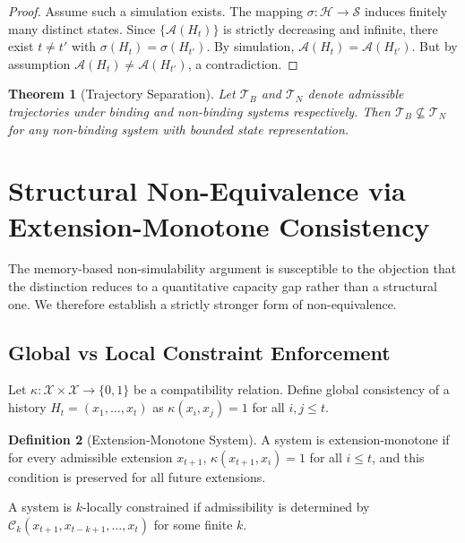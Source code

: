 \documentclass[12pt, a4paper]{article}
\theoremstyle{plain}
\newtheorem{theorem}{Theorem}[section]
\theoremstyle{definition}
\newtheorem{definition}[theorem]{Definition}
\theoremstyle{remark}
\begin{document}
\begin{proof}
Assume such a simulation exists. The mapping $\sigma : \mathcal{H} \to \mathcal{S}$ induces finitely many distinct states. Since $\{\mathcal{A}(H_t)\}$ is strictly decreasing and infinite, there exist $t \neq t'$ with $\sigma(H_t) = \sigma(H_{t'})$. By simulation, $\mathcal{A}(H_t) = \mathcal{A}(H_{t'})$. But by assumption $\mathcal{A}(H_t) \neq \mathcal{A}(H_{t'})$, a contradiction.
\end{proof}

\begin{theorem}[Trajectory Separation]
Let $\mathcal{T}_B$ and $\mathcal{T}_N$ denote admissible trajectories under binding and non-binding systems respectively. Then $\mathcal{T}_B \not\subseteq \mathcal{T}_N$ for any non-binding system with bounded state representation.
\end{theorem}

\section{Structural Non-Equivalence via Extension-Monotone Consistency}

The memory-based non-simulability argument is susceptible to the objection that the distinction reduces to a quantitative capacity gap rather than a structural one. We therefore establish a strictly stronger form of non-equivalence.

\subsection{Global vs Local Constraint Enforcement}

Let $\kappa : \mathcal{X} \times \mathcal{X} \to \{0,1\}$ be a compatibility relation. Define global consistency of a history $H_t = (x_1, \dots, x_t)$ as $\kappa(x_i, x_j) = 1$ for all $i,j \le t$.

\begin{definition}[Extension-Monotone System]
A system is extension-monotone if for every admissible extension $x_{t+1}$, $\kappa(x_{t+1}, x_i) = 1$ for all $i \le t$, and this condition is preserved for all future extensions.
\end{definition}

A system is $k$-locally constrained if admissibility is determined by $\mathcal{C}_k(x_{t+1}, x_{t-k+1}, \dots, x_t)$ for some finite $k$.
\end{document}
